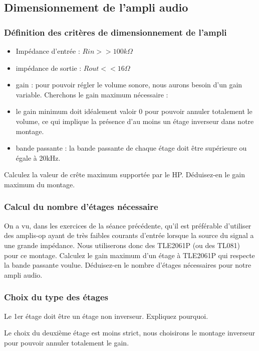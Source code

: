 \documentclass{../template/labo}
\begin{document}
\subsection{Dimensionnement de l'ampli audio}
\label{Dimensionnement}

\subsubsection{Définition des critères de dimensionnement de l'ampli}

\begin{itemize}
\item Impédance d'entrée : $Rin >> 100k\Omega$
\item impédance de sortie : $Rout << 16\Omega$
\item gain : pour pouvoir régler le volume sonore, nous aurons besoin d'un gain variable. Cherchons le gain maximum nécessaire :
\item le gain minimum doit idéalement valoir 0 pour pouvoir annuler totalement le volume, ce qui implique la présence d'au moins un étage inverseur dans notre montage.
\item bande passante : la bande passante de chaque étage doit être supérieure ou égale à 20kHz.
\end{itemize}

\Question
{
Calculez la valeur de crête maximum supportée par le HP.
}
{}
\Question
{
Déduisez-en le gain maximum du montage.
}
{}

\subsubsection{Calcul du nombre d'étages nécessaire}
On a vu, dans les exercices de la séance précédente, qu'il est préférable d'utiliser des amplis-op ayant de très faibles courants d'entrée lorsque la source du signal a une grande impédance. Nous utiliserons donc des TLE2061P (ou des TL081) pour ce montage.
\Question
{
Calculez le gain maximum d'un étage à TLE2061P qui respecte la bande passante voulue.
}
{}
\Question
{
Déduisez-en le nombre d'étages nécessaires pour notre ampli audio.
}
{}


\subsubsection{Choix du type des étages}
\Question
{
Le 1er étage doit être un étage non inverseur. Expliquez pourquoi.
}
{}

Le choix du deuxième étage est moins strict, nous choisirons le montage inverseur pour pouvoir annuler totalement le gain.
\end{document}

